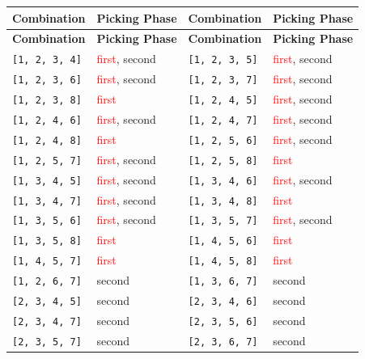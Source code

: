\small
\begin{longtable}{|p{2.5cm}|p{2.5cm}||p{2.5cm}|p{2.5cm}|}
\hline
\rowcolor{black!20}
\textbf{Combination} & \textbf{Picking Phase} & \textbf{Combination} & \textbf{Picking Phase} \\ \hline
\endfirsthead

\hline
\rowcolor{black!20}
\textbf{Combination} & \textbf{Picking Phase} & \textbf{Combination} & \textbf{Picking Phase} \\ \hline
\endhead

\texttt{[1, 2, 3, 4]} & \textcolor{red}{first}, \textcolor{CustomBlue}{second} & \texttt{[1, 2, 3, 5]} & \textcolor{red}{first}, \textcolor{CustomBlue}{second} \\ \hline
\texttt{[1, 2, 3, 6]} & \textcolor{red}{first}, \textcolor{CustomBlue}{second} & \texttt{[1, 2, 3, 7]} & \textcolor{red}{first}, \textcolor{CustomBlue}{second} \\ \hline
\texttt{[1, 2, 3, 8]} & \textcolor{red}{first} & \texttt{[1, 2, 4, 5]} & \textcolor{red}{first}, \textcolor{CustomBlue}{second} \\ \hline
\texttt{[1, 2, 4, 6]} & \textcolor{red}{first}, \textcolor{CustomBlue}{second} & \texttt{[1, 2, 4, 7]} & \textcolor{red}{first}, \textcolor{CustomBlue}{second} \\ \hline
\texttt{[1, 2, 4, 8]} & \textcolor{red}{first} & \texttt{[1, 2, 5, 6]} & \textcolor{red}{first}, \textcolor{CustomBlue}{second} \\ \hline
\texttt{[1, 2, 5, 7]} & \textcolor{red}{first}, \textcolor{CustomBlue}{second} & \texttt{[1, 2, 5, 8]} & \textcolor{red}{first} \\ \hline
\texttt{[1, 3, 4, 5]} & \textcolor{red}{first}, \textcolor{CustomBlue}{second} & \texttt{[1, 3, 4, 6]} & \textcolor{red}{first}, \textcolor{CustomBlue}{second} \\ \hline
\texttt{[1, 3, 4, 7]} & \textcolor{red}{first}, \textcolor{CustomBlue}{second} & \texttt{[1, 3, 4, 8]} & \textcolor{red}{first} \\ \hline
\texttt{[1, 3, 5, 6]} & \textcolor{red}{first}, \textcolor{CustomBlue}{second} & \texttt{[1, 3, 5, 7]} & \textcolor{red}{first}, \textcolor{CustomBlue}{second} \\ \hline
\texttt{[1, 3, 5, 8]} & \textcolor{red}{first} & \texttt{[1, 4, 5, 6]} & \textcolor{red}{first} \\ \hline
\texttt{[1, 4, 5, 7]} & \textcolor{red}{first} & \texttt{[1, 4, 5, 8]} & \textcolor{red}{first} \\ \hline
\texttt{[1, 2, 6, 7]} & \textcolor{CustomBlue}{second} & \texttt{[1, 3, 6, 7]} & \textcolor{CustomBlue}{second} \\ \hline
\texttt{[2, 3, 4, 5]} & \textcolor{CustomBlue}{second} & \texttt{[2, 3, 4, 6]} & \textcolor{CustomBlue}{second} \\ \hline
\texttt{[2, 3, 4, 7]} & \textcolor{CustomBlue}{second} & \texttt{[2, 3, 5, 6]} & \textcolor{CustomBlue}{second} \\ \hline
\texttt{[2, 3, 5, 7]} & \textcolor{CustomBlue}{second} & \texttt{[2, 3, 6, 7]} & \textcolor{CustomBlue}{second} \\ \hline


\end{longtable}
